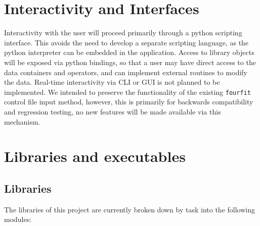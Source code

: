 \documentclass[hidelinks]{article}
\let\Oldsection\section
\renewcommand{\section}{\FloatBarrier\Oldsection}
\let\Oldsubsection\subsection
\renewcommand{\subsection}{\FloatBarrier\Oldsubsection}
\begin{document}
\section{Interactivity and Interfaces}

Interactivity with the user will proceed primarily through a python scripting interface. This avoids the need to develop a separate scripting language, 
as the python interpreter can be embedded in the application. Access to library objects will be exposed via python bindings, so that a user may have direct access 
to the data containers and operators, and can implement external routines to modify the data. Real-time interactivity via CLI or GUI is 
not planned to be implemented. We intended to preserve the functionality of the existing \texttt{fourfit} control file input method, however, this
is primarily for backwards compatibility and regression testing, no new features will be made available via this mechanism.

\section{Libraries and executables}

\subsection{Libraries}

The libraries of this project are currently broken down by task into the following modules:
\end{document}
